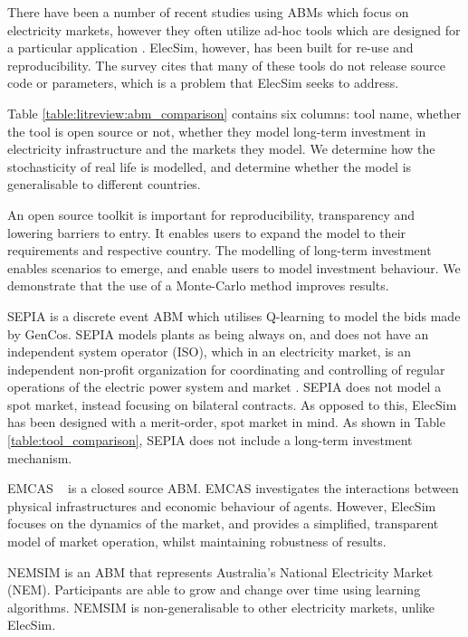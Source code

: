 There have been a number of recent studies using ABMs which focus on electricity markets, however they often utilize ad-hoc tools which are designed for a particular application \cite{Saxena2019, hadar2019, Kunzel2018}. ElecSim, however, has been built for re-use and reproducibility. The survey \cite{Weidlich2008} cites that many of these tools do not release source code or parameters, which is a problem that ElecSim seeks to address.

Table \ref{table:litreview:abm_comparison} contains six columns: tool name, whether the tool is open source or not, whether they model long-term investment in electricity infrastructure and the markets they model. We determine how the stochasticity of real life is modelled, and determine whether the model is generalisable to different countries. 


An open source toolkit is important for reproducibility, transparency and lowering barriers to entry. It enables users to expand the model to their requirements and respective country. The modelling of long-term investment enables scenarios to emerge, and enable users to model investment behaviour. We demonstrate that the use of a Monte-Carlo method improves results.

SEPIA \cite{Harp2000} is a discrete event ABM which utilises Q-learning to model the bids made by GenCos. SEPIA models plants as being always on, and does not have an independent system operator (ISO), which in an electricity market, is an independent non-profit organization for coordinating and controlling of regular operations of the electric power system and market \cite{Zhou2007}. SEPIA does not model a spot market, instead focusing on bilateral contracts. As opposed to this, ElecSim has been designed with a merit-order, spot market in mind. As shown in Table \ref{table:tool_comparison}, SEPIA does not include a long-term investment mechanism. 

EMCAS ~\cite{Conzelmann} is a closed source ABM. EMCAS investigates the interactions between physical infrastructures and economic behaviour of agents. However, ElecSim focuses on the dynamics of the market, and provides a simplified, transparent model of market operation, whilst maintaining robustness of results.

NEMSIM \cite{Grozev2005} is an ABM that represents Australia's National Electricity Market (NEM). Participants are able to grow and change over time using learning algorithms. NEMSIM is non-generalisable to other electricity markets, unlike ElecSim.

